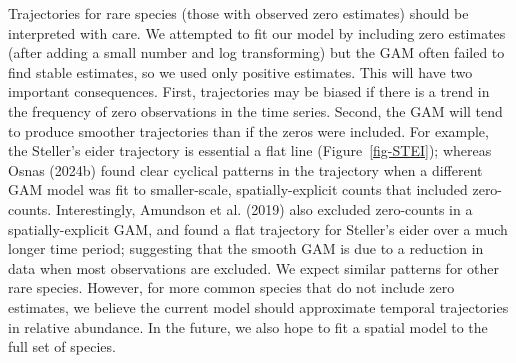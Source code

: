 \documentclass[
]{article}
\begin{document}
Trajectories for rare species (those with observed zero estimates)
should be interpreted with care. We attempted to fit our model by
including zero estimates (after adding a small number and log
transforming) but the GAM often failed to find stable estimates, so we
used only positive estimates. This will have two important consequences.
First, trajectories may be biased if there is a trend in the frequency
of zero observations in the time series. Second, the GAM will tend to
produce smoother trajectories than if the zeros were included. For
example, the Steller's eider trajectory is essential a flat line
(Figure~\ref{fig-STEI}); whereas Osnas (2024b) found clear cyclical
patterns in the trajectory when a different GAM model was fit to
smaller-scale, spatially-explicit counts that included zero-counts.
Interestingly, Amundson et al. (2019) also excluded zero-counts in a
spatially-explicit GAM, and found a flat trajectory for Steller's eider
over a much longer time period; suggesting that the smooth GAM is due to
a reduction in data when most observations are excluded. We expect
similar patterns for other rare species. However, for more common
species that do not include zero estimates, we believe the current model
should approximate temporal trajectories in relative abundance. In the
future, we also hope to fit a spatial model to the full set of species.
\end{document}
